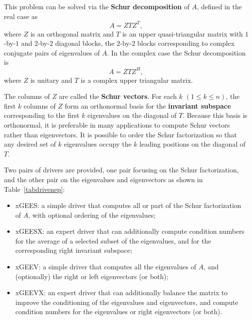 This problem can be solved
via the {\bf Schur decomposition}
 of $A$,
defined in the real case as
\[
A = ZTZ^T,
\]
where $Z$ is an orthogonal matrix and $T$ is an upper quasi-triangular matrix
with $1$-by-$1$ and $2$-by-$2$ diagonal blocks, the $2$-by-$2$ blocks
corresponding to complex conjugate pairs of eigenvalues of $A$. In the complex
case the Schur decomposition is
\[
A = ZTZ^H,
\]
where $Z$ is unitary and $T$ is a complex upper triangular matrix.

The columns of $Z$ are called the {\bf Schur vectors}.
For each $k$
$(1 \leq k \leq n)$, the first $k$ columns of $Z$ form an orthonormal
basis for the {\bf invariant subspace} corresponding to the
first $k$ eigenvalues on the diagonal of $T$. Because this
basis is orthonormal, it is preferable in many
applications to compute Schur vectors rather than
eigenvectors. It is possible to order the Schur
factorization so that any desired set of $k$ eigenvalues
occupy the $k$ leading positions on the diagonal of $T$.

Two pairs of drivers 
are provided, one pair focusing on the Schur
factorization, and the other pair on the eigenvalues and eigenvectors
as shown in Table~\ref{tabdrivenep}:

\begin{itemize}

\item xGEES: a simple driver that computes all or part of the Schur
factorization of $A$, with optional ordering of the eigenvalues;

\item xGEESX: an expert driver that can additionally compute condition
numbers for the average of a selected subset of the eigenvalues, and for
the corresponding right invariant subspace;

\item xGEEV: a simple driver that computes all the eigenvalues of $A$,
and (optionally) the right or left eigenvectors (or both);

\item xGEEVX: an expert driver that can additionally balance the
matrix to improve the conditioning of the eigenvalues and eigenvectors,
and compute condition numbers for the eigenvalues or right eigenvectors
(or both).

\end{itemize}

